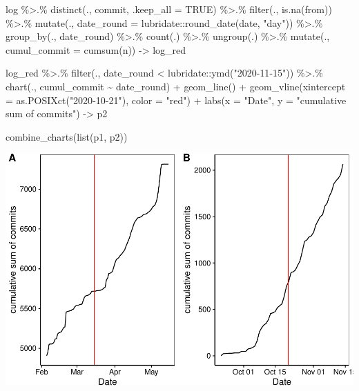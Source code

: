 \documentclass[
]{article}
\newenvironment{Shaded}{\begin{snugshade}}{\end{snugshade}}
\newcommand{\AttributeTok}[1]{\textcolor[rgb]{0.77,0.63,0.00}{#1}}
\newcommand{\ConstantTok}[1]{\textcolor[rgb]{0.00,0.00,0.00}{#1}}
\newcommand{\FunctionTok}[1]{\textcolor[rgb]{0.00,0.00,0.00}{#1}}
\newcommand{\NormalTok}[1]{#1}
\newcommand{\OtherTok}[1]{\textcolor[rgb]{0.56,0.35,0.01}{#1}}
\newcommand{\SpecialCharTok}[1]{\textcolor[rgb]{0.00,0.00,0.00}{#1}}
\newcommand{\StringTok}[1]{\textcolor[rgb]{0.31,0.60,0.02}{#1}}
\begin{document}
\begin{Shaded}
\begin{Highlighting}[]
\NormalTok{log }\SpecialCharTok{\%\textgreater{}.\%} 
  \FunctionTok{distinct}\NormalTok{(., commit, }\AttributeTok{.keep\_all =} \ConstantTok{TRUE}\NormalTok{) }\SpecialCharTok{\%\textgreater{}.\%}
  \FunctionTok{filter}\NormalTok{(., }\FunctionTok{is.na}\NormalTok{(from)) }\SpecialCharTok{\%\textgreater{}.\%}
  \FunctionTok{mutate}\NormalTok{(., }\AttributeTok{date\_round =}\NormalTok{ lubridate}\SpecialCharTok{::}\FunctionTok{round\_date}\NormalTok{(date, }\StringTok{"day"}\NormalTok{)) }\SpecialCharTok{\%\textgreater{}.\%}
  \FunctionTok{group\_by}\NormalTok{(., date\_round) }\SpecialCharTok{\%\textgreater{}.\%}
  \FunctionTok{count}\NormalTok{(.) }\SpecialCharTok{\%\textgreater{}.\%}
  \FunctionTok{ungroup}\NormalTok{(.) }\SpecialCharTok{\%\textgreater{}.\%}
  \FunctionTok{mutate}\NormalTok{(., }\AttributeTok{cumul\_commit =} \FunctionTok{cumsum}\NormalTok{(n)) }\OtherTok{{-}\textgreater{}}\NormalTok{ log\_red}


\NormalTok{log\_red }\SpecialCharTok{\%\textgreater{}.\%}
  \FunctionTok{filter}\NormalTok{(., date\_round }\SpecialCharTok{\textless{}}\NormalTok{ lubridate}\SpecialCharTok{::}\FunctionTok{ymd}\NormalTok{(}\StringTok{"2020{-}11{-}15"}\NormalTok{)) }\SpecialCharTok{\%\textgreater{}.\%}
  \FunctionTok{chart}\NormalTok{(., cumul\_commit }\SpecialCharTok{\textasciitilde{}}\NormalTok{ date\_round) }\SpecialCharTok{+}
  \FunctionTok{geom\_line}\NormalTok{() }\SpecialCharTok{+}
  \FunctionTok{geom\_vline}\NormalTok{(}\AttributeTok{xintercept =} \FunctionTok{as.POSIXct}\NormalTok{(}\StringTok{"2020{-}10{-}21"}\NormalTok{), }\AttributeTok{color =} \StringTok{"red"}\NormalTok{) }\SpecialCharTok{+}
  \FunctionTok{labs}\NormalTok{(}\AttributeTok{x =} \StringTok{"Date"}\NormalTok{, }\AttributeTok{y =} \StringTok{"cumulative sum of commits"}\NormalTok{) }\OtherTok{{-}\textgreater{}}\NormalTok{ p2}

\FunctionTok{combine\_charts}\NormalTok{(}\FunctionTok{list}\NormalTok{(p1, p2))}
\end{Highlighting}
\end{Shaded}

\includegraphics{teaching_data_science_files/figure-latex/unnamed-chunk-4-1.pdf}
\end{document}
